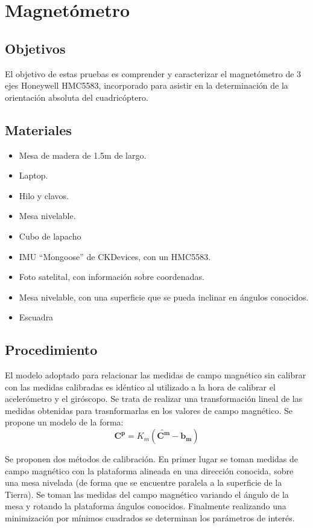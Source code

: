 \documentclass[main]{subfiles}
\begin{document}
\chapter{Magnetómetro}
\label{chap:magnetometro}

\section{Objetivos}

El objetivo de estas pruebas es comprender y caracterizar el magnetómetro de 3 ejes Honeywell HMC5583, incorporado para asistir en la determinación de la orientación absoluta del cuadricóptero.

\section{Materiales}
\label{sec:materiales}

\begin{itemize}
\item Mesa de madera de 1.5m de largo.
\item Laptop.
\item Hilo y clavos.
\item Mesa nivelable.
\item Cubo de lapacho
\item IMU ``Mongoose'' de CKDevices, con un HMC5583.
\item Foto satelital, con información sobre coordenadas.
\item Mesa nivelable, con una superficie que se pueda inclinar en ángulos conocidos.
\item Escuadra
\end{itemize}

\newpage

\section{Procedimiento}
\label{sec:procedimiento}

El modelo adoptado para relacionar las medidas de campo magnético sin calibrar con las medidas calibradas es idéntico al utilizado a la hora de calibrar el acelerómetro y el giróscopo. Se trata de realizar una transformación lineal de las medidas obtenidas para trasnformarlas en los valores de campo magnético. Se propone un modelo de la forma:
$$
\mathbf{C^p} =K_m (\mathbf{\tilde{C^m}} -  \mathbf{b_m})
$$

Se proponen dos métodos de calibración. En primer lugar se toman medidas de campo magnético con la plataforma alineada en una dirección conocida, sobre una mesa nivelada (de forma que se encuentre paralela a la superficie de la Tierra). Se toman las medidas del campo magnético variando el ángulo de la mesa y rotando la plataforma ángulos conocidos. Finalmente realizando una minimización por mínimos cuadrados se determinan los parámetros de interés.  
\end{document}
